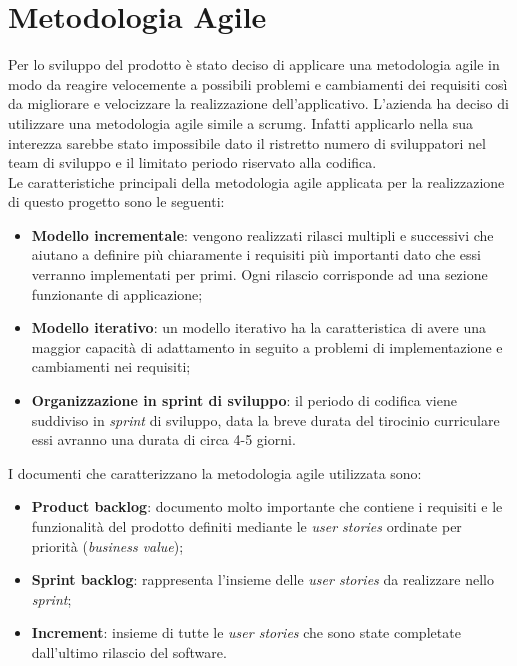 \section{Metodologia Agile}
Per lo sviluppo del prodotto è stato deciso di applicare una metodologia agile in modo da reagire velocemente a possibili problemi e cambiamenti dei requisiti così da migliorare e velocizzare la realizzazione dell'applicativo. L'azienda ha deciso di utilizzare una metodologia agile simile a \gls{scrumg}. Infatti applicarlo nella sua interezza sarebbe stato impossibile dato il ristretto numero di sviluppatori nel team di sviluppo e il limitato periodo riservato alla codifica. \\
Le caratteristiche principali della metodologia agile applicata per la realizzazione di questo progetto sono le seguenti:
\begin{itemize}
	\item \textbf{Modello incrementale}: vengono realizzati rilasci multipli e successivi che aiutano a definire più chiaramente i requisiti più importanti dato che essi verranno implementati per primi. Ogni rilascio corrisponde ad una sezione funzionante di applicazione;
	
	\item \textbf{Modello iterativo}: un modello iterativo ha la caratteristica di avere una maggior capacità di adattamento in seguito a problemi di implementazione e cambiamenti nei requisiti;
	
	\item \textbf{Organizzazione in sprint di sviluppo}: il periodo di codifica viene suddiviso in \emph{sprint} di sviluppo, data la breve durata del tirocinio curriculare essi avranno una durata di circa 4-5 giorni.
\end{itemize}
\noindent
I documenti che caratterizzano la metodologia agile utilizzata sono:
\begin{itemize}
	\item \textbf{Product backlog}: documento molto importante che contiene i requisiti e le funzionalità del prodotto definiti mediante le \emph{user stories} ordinate per priorità (\emph{business value});
	
	\item \textbf{Sprint backlog}: rappresenta l'insieme delle \emph{user stories} da realizzare nello \emph{sprint};
	
	\item \textbf{Increment}: insieme di tutte le \emph{user stories} che sono state completate dall'ultimo rilascio del software.
\end{itemize}
